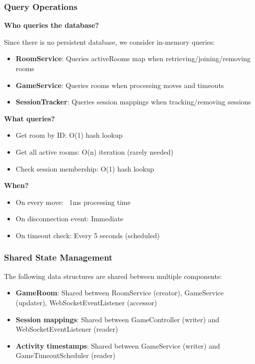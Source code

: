 \documentclass{scrartcl}
\begin{document}
\subsubsection{Query Operations}

\textbf{Who queries the database?}

Since there is no persistent database, we consider in-memory queries:

\begin{itemize}
  \item \textbf{RoomService}: Queries activeRooms map when retrieving/joining/removing rooms
  \item \textbf{GameService}: Queries rooms when processing moves and timeouts
  \item \textbf{SessionTracker}: Queries session mappings when tracking/removing sessions
\end{itemize}

\textbf{What queries?}

\begin{itemize}
  \item Get room by ID: O(1) hash lookup
  \item Get all active rooms: O(n) iteration (rarely needed)
  \item Check session membership: O(1) hash lookup
\end{itemize}

\textbf{When?}

\begin{itemize}
  \item On every move: ~1ms processing time
  \item On disconnection event: Immediate
  \item On timeout check: Every 5 seconds (scheduled)
\end{itemize}

\subsubsection{Shared State Management}

The following data structures are shared between multiple components:

\begin{itemize}
  \item \textbf{GameRoom}: Shared between RoomService (creator), GameService (updater), WebSocketEventListener (accessor)
  \item \textbf{Session mappings}: Shared between GameController (writer) and WebSocketEventListener (reader)
  \item \textbf{Activity timestamps}: Shared between GameService (writer) and GameTimeoutScheduler (reader)
\end{itemize}
\end{document}
